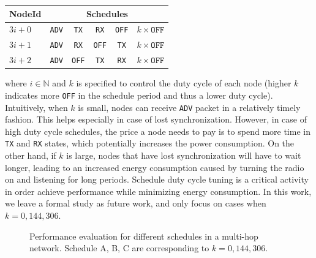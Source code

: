 \begin{tabular}{ l | c | c | c | c | c }
  \hline                       
  NodeId & \multicolumn{5}{c}{Schedules} \\
  \hline
  $3i+0$ & \texttt{ADV} & \texttt{TX} & \texttt{RX} & \texttt{OFF} & $k \times \texttt{OFF}$ \\
  $3i+1$ & \texttt{ADV} & \texttt{RX} & \texttt{OFF} & \texttt{TX} & $k \times \texttt{OFF}$ \\
  $3i+2$ & \texttt{ADV} & \texttt{OFF} & \texttt{TX} & \texttt{RX} & $k \times \texttt{OFF}$ \\
  \hline  
\end{tabular}
where $i \in \mathbb{N}$ and $k$ is specified to control the duty cycle of each node (higher $k$ indicates more \texttt{OFF} in the schedule period and thus a lower duty cycle). Intuitively, when $k$ is small, nodes can receive \texttt{ADV} packet in a relatively timely fashion. This helps especially in case of lost synchronization. However, in case of high duty cycle schedules, the price a node needs to pay is to spend more time in \texttt{TX} and \texttt{RX} states, which potentially increases the power consumption. On the other hand, if $k$ is large, nodes that have lost synchronization will have to wait longer, leading to an increased energy consumption caused by turning the radio on and listening for long periods. Schedule duty cycle tuning is a critical activity in order achieve performance while minimizing energy consumption. In this work, we leave a formal study as future work, and only focus on cases when $k = 0, 144, 306$.

\begin{figure}
\hfill
{}
\hfill
{}
\hfill
\caption{Performance evaluation for different schedules in a multi-hop network. Schedule A, B, C are corresponding to $k = 0, 144, 306$.}
\label{fig:evaluation}
\end{figure}

